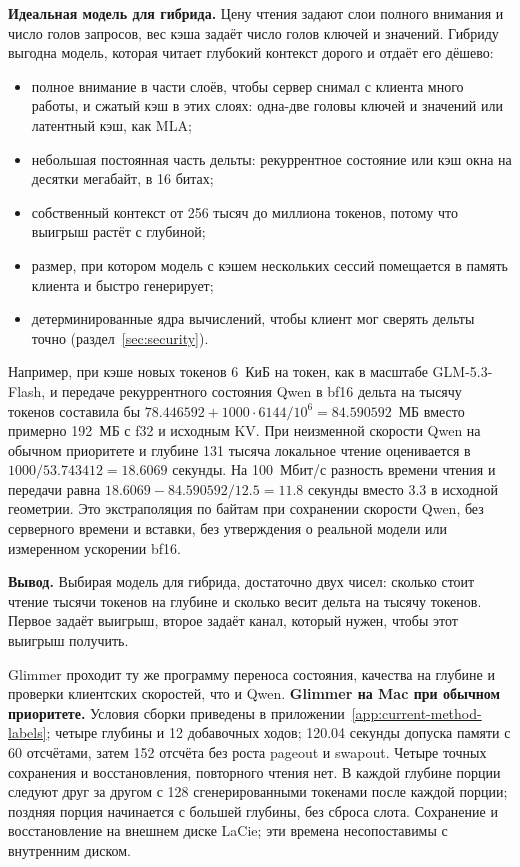 \textbf{Идеальная модель для гибрида.} Цену чтения задают слои полного внимания и число голов запросов, вес кэша
задаёт число голов ключей и значений. Гибриду выгодна модель, которая читает глубокий контекст дорого и отдаёт его
дёшево:
\begin{itemize}
\item полное внимание в части слоёв, чтобы сервер снимал с клиента много работы, и сжатый кэш в этих слоях: одна-две
головы ключей и значений или латентный кэш, как MLA;
\item небольшая постоянная часть дельты: рекуррентное состояние или кэш окна на десятки мегабайт, в 16 битах;
\item собственный контекст от 256 тысяч до миллиона токенов, потому что выигрыш растёт с глубиной;
\item размер, при котором модель с кэшем нескольких сессий помещается в память клиента и быстро генерирует;
\item детерминированные ядра вычислений, чтобы клиент мог сверять дельты точно (раздел~\ref{sec:security}).
\end{itemize}
Например, при кэше новых токенов 6~КиБ на токен, как в масштабе GLM-5.3-Flash,
и передаче рекуррентного состояния Qwen в bf16 дельта на тысячу токенов составила бы
$78.446592+1000\cdot6144/10^6=84.590592$~МБ вместо примерно 192~МБ с f32 и исходным KV.
При неизменной скорости Qwen на обычном приоритете и глубине 131 тысяча локальное чтение оценивается в
$1000/53.743412=18.6069$ секунды. На 100~Мбит/с разность времени чтения и передачи равна
$18.6069-84.590592/12.5=11.8$ секунды вместо 3.3 в исходной геометрии.
Это экстраполяция по байтам при сохранении скорости Qwen, без серверного времени и вставки,
без утверждения о реальной модели или измеренном ускорении bf16.

\textbf{Вывод.} Выбирая модель для гибрида, достаточно двух чисел: сколько стоит чтение тысячи токенов на глубине и
сколько весит дельта на тысячу токенов. Первое задаёт выигрыш, второе задаёт канал, который нужен, чтобы этот выигрыш
получить.

Glimmer проходит ту же программу переноса состояния, качества на глубине и проверки клиентских скоростей, что и Qwen.
\textbf{Glimmer на Mac при обычном приоритете.} Условия сборки приведены в приложении~\ref{app:current-method-labels};
четыре глубины и 12 добавочных ходов; 120.04 секунды допуска памяти с 60 отсчётами,
затем 152 отсчёта без роста pageout и swapout. Четыре точных сохранения и восстановления,
повторного чтения нет. В каждой глубине порции следуют друг за другом с 128 сгенерированными токенами
после каждой порции; поздняя порция начинается с большей глубины, без сброса слота.
Сохранение и восстановление на внешнем диске LaCie; эти времена несопоставимы с внутренним диском.

